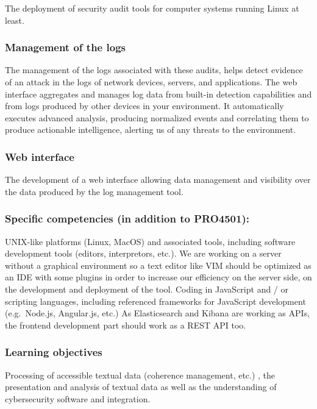The deployment of security audit tools for computer systems running Linux at least.

\vspace{0.5cm}
\subsubsection{Management of the logs}
The management of the logs associated with these audits, helps detect evidence of an attack in the logs of network devices, servers, and applications. The web interface aggregates and manages log data from built-in detection capabilities and from logs produced by other devices in your environment. It automatically executes advanced analysis, producing normalized events and correlating them to produce actionable intelligence, alerting us of any threats to the environment.


\vspace{0.5cm}
\subsubsection{Web interface}
The development of a web interface allowing data management and visibility over the data produced
by the log management tool.


\vspace{0.5cm}
\subsubsection{Specific competencies (in addition to PRO4501):}
UNIX-like platforms (Linux, MacOS) and associated tools, including
software development tools (editors, interpretors, etc.). We are working on a
server without a graphical environment so a text editor like VIM should be
optimized as an IDE with some plugins in order to increase our efficiency on the
server side, on the development and deployment of the tool.
Coding in JavaScript and / or scripting languages, including referenced
frameworks for JavaScript development (e.g.~Node.js, Angular.js, etc.)
As Elasticsearch and Kibana are working as APIs, the frontend development part should work
as a REST API too.


\vspace{0.5cm}
\subsubsection{Learning objectives}
Processing of accessible textual data (coherence management, etc.)
, the presentation and analysis of textual data as well as the understanding of cybersecurity
software and integration. \\



